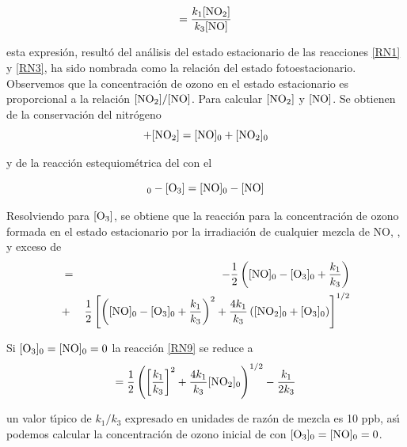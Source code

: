 \begin{equation}
[\ce{O3}]=\frac{k_1[\ce{NO2}]}{k_3[\ce{NO}]}
\label{RN8}
\end{equation}

esta expresi\'on, result\'o del an\'alisis del estado estacionario de las reacciones \ref{RN1} y \ref{RN3}, ha sido nombrada como la relaci\'on del estado fotoestacionario. Observemos que la concentraci\'on de ozono en el estado estacionario es proporcional a la relaci\'on $[\ce{NO2}]/[\ce{NO}]$. Para calcular  $[\ce{NO2}]$ y $[\ce{NO}]$. Se obtienen de la conservaci\'on del nitr\'ogeno
\begin{equation*}
[\ce{NO}] + [\ce{NO2}] = [\ce{NO}]_0 + [\ce{NO2}]_0
\end{equation*}

y de la reacci\'on estequiom\'etrica del  con el 

\begin{equation*}
[\ce{O3}]_0 - [\ce{O3}] = [\ce{NO}]_0 - [\ce{NO}]
\end{equation*}

Resolviendo para $[\ce{O3}]$, se obtiene que la reacci\'on para la concentraci\'on de ozono formada en el estado estacionario por la irradiaci\'on de cualquier mezcla de NO, ,  y exceso de 
\begin{eqnarray}
 [\ce{O3}]&=&-\frac{1}{2}\left([\ce{NO}]_0-[\ce{O3}]_0+\frac{k_1}{k_3}\right) \nonumber\\
  &+&\frac{1}{2}\left[\left([\ce{NO}]_0-[\ce{O3}]_0+\frac{k_1}{k_3}\right)^2+\frac{4k_1}{k_3} \left([\ce{NO2}]_0+[\ce{O3}]_0\right)\right]^{1/2}
\label{RN9}
\end{eqnarray}

Si $[\ce{O3}]_0=[\ce{NO}]_0=0$ la reacci\'on \ref{RN9} se reduce a 
\begin{equation}
 [\ce{O3}]=\frac{1}{2}\left(\left[\frac{k_1}{k_3}\right]^2+\frac{4k_1}{k_3} [\ce{NO2}]_0\right)^{1/2} -\frac{k_1}{2k_3}
\label{RN10}
\end{equation}

un valor t\'{\i}pico de $k_1/k_3$ expresado en unidades de raz\'on de mezcla es 10 ppb, as\'{\i} podemos calcular la concentraci\'on de ozono inicial de  con   $[\ce{O3}]_0=[\ce{NO}]_0=0$.

